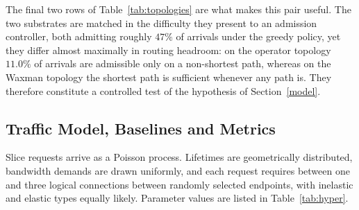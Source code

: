 \documentclass[10pt,journal,comsoc]{IEEEtran}
\begin{document}
The final two rows of Table~\ref{tab:topologies} are what makes this pair
useful. The two substrates are matched in the difficulty they present to
an admission controller, both admitting roughly $47\%$ of arrivals under
the greedy policy, yet they differ almost maximally in routing headroom:
on the operator topology $11.0\%$ of arrivals are admissible only on a
non-shortest path, whereas on the Waxman topology the shortest path is
sufficient whenever any path is. They therefore constitute a controlled
test of the hypothesis of Section~\ref{model}.

\subsection{Traffic Model, Baselines and Metrics}
Slice requests arrive as a Poisson process. Lifetimes are geometrically
distributed, bandwidth demands are drawn uniformly, and each request
requires between one and three logical connections between randomly
selected endpoints, with inelastic and elastic types equally likely.
Parameter values are listed in Table~\ref{tab:hyper}.
\end{document}
